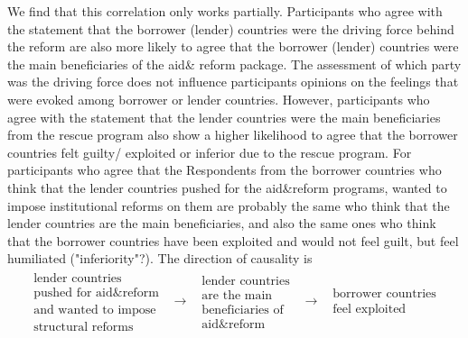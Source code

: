  We find that this correlation only works partially. Participants who agree with the statement that the borrower (lender) countries were the driving force behind the reform are also more likely to agree that the borrower (lender) countries were the main beneficiaries of the aid& reform package. The assessment of which party was the driving force does not influence participants opinions on the feelings that were evoked among borrower or lender countries. However, participants who agree with the statement that the lender countries were the main beneficiaries from the rescue program also show a higher likelihood to agree that the borrower countries felt guilty/ exploited or inferior due to the rescue program. For participants who agree that the 
 Respondents from the borrower countries who think that the lender countries
 pushed for the aid\&reform programs, wanted to impose institutional reforms
 on them are probably the same who think that the lender countries are the
main beneficiaries, and also the same ones who think that the borrower
countries have been exploited and would not feel guilt, but feel humiliated
("inferiority"?). The direction of causality is%
\begin{equation*}
\begin{array}{ccccc}
\begin{array}{c}
\text{lender countries} \\ 
\text{pushed for aid\&reform} \\ 
\text{and wanted to impose} \\ 
\text{structural reforms}%
\end{array}
& \rightarrow  & 
\begin{array}{c}
\text{lender countries} \\ 
\text{are the main} \\ 
\text{beneficiaries of} \\ 
\text{aid\&reform}%
\end{array}
& \rightarrow  & 
\begin{array}{c}
\text{borrower countries} \\ 
\text{feel exploited}%
 \end{array}%
 \end{array}%
 \end{equation*}
